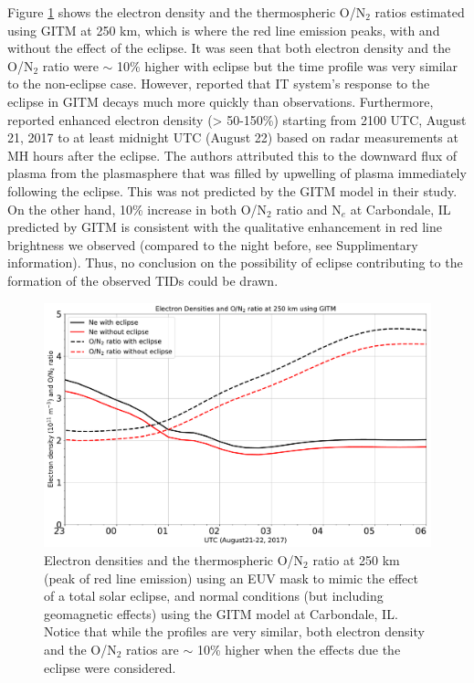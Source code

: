 Figure \ref{fig:ec_ne} shows the electron density and  the thermospheric O/N$_2$ ratios estimated using GITM at 250 km, which is where the red line emission peaks, with and without the effect of the eclipse. It was seen that both electron density and the O/N$_2$ ratio were $\sim$ 10\% higher with eclipse but the time profile was very similar to the non-eclipse case. However, \citep{wu_gitm-data_2018} reported that IT system's response to the eclipse in GITM decays much more quickly than observations. Furthermore, \citet{goncharenko_mh_hill_eclipse} reported enhanced electron density (> 50-150\%) starting from 2100 UTC, August 21, 2017 to at least midnight UTC (August 22) based on radar measurements at MH hours after the eclipse.  The authors attributed this to the downward flux of plasma from the plasmasphere that was filled by upwelling of plasma immediately following the eclipse. This was not predicted by the GITM model in their study. On the other hand, 10\% increase in both O/N$_2$ ratio and N$_e$ at Carbondale, IL predicted by GITM is consistent with the qualitative enhancement in red line brightness we observed (compared to the night before, see Supplimentary information).  Thus, no conclusion on the possibility of eclipse contributing to the formation of the observed TIDs could be drawn.  
   \begin{figure}
 \centering\includegraphics[width=30pc]{ec_vs_nec_tid.pdf}
 \caption{ Electron densities  and the thermospheric O/N$_2$ ratio at 250 km (peak of red line emission) using an EUV mask to mimic the effect of a total solar eclipse, and normal conditions (but including geomagnetic effects) using the GITM model at Carbondale, IL. Notice that while the profiles are very similar, both electron density and the O/N$_2$ ratios are $\sim$ 10\% higher when the effects due the eclipse were considered. }
 \label{fig:ec_ne}
 \end{figure}

